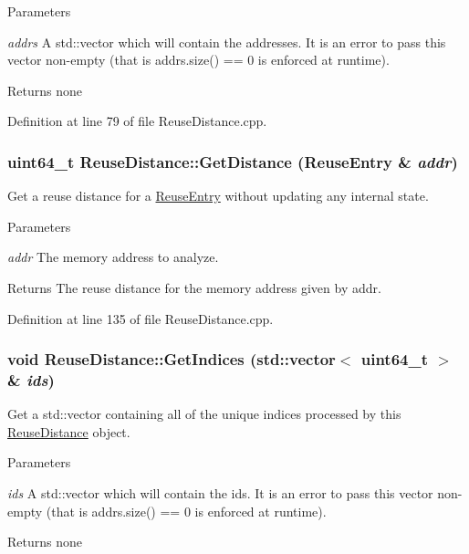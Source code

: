 \begin{DoxyParams}{Parameters}
\item[{\em addrs}]A std::vector which will contain the addresses. It is an error to pass this vector non-\/empty (that is addrs.size() == 0 is enforced at runtime).\end{DoxyParams}
\begin{DoxyReturn}{Returns}
none 
\end{DoxyReturn}


Definition at line 79 of file ReuseDistance.cpp.\hypertarget{class_reuse_distance_ac70a23e9dc4b242f11d76e257e894bef}{
\subsubsection[{GetDistance}]{\setlength{\rightskip}{0pt plus 5cm}uint64\_\-t ReuseDistance::GetDistance ({\bf ReuseEntry} \& {\em addr})}}
\label{class_reuse_distance_ac70a23e9dc4b242f11d76e257e894bef}
Get a reuse distance for a \hyperlink{struct_reuse_entry}{ReuseEntry} without updating any internal state.


\begin{DoxyParams}{Parameters}
\item[{\em addr}]The memory address to analyze.\end{DoxyParams}
\begin{DoxyReturn}{Returns}
The reuse distance for the memory address given by addr. 
\end{DoxyReturn}


Definition at line 135 of file ReuseDistance.cpp.\hypertarget{class_reuse_distance_a99fb4b3aae663676515ad354691b7cc6}{
\subsubsection[{GetIndices}]{\setlength{\rightskip}{0pt plus 5cm}void ReuseDistance::GetIndices (std::vector$<$ uint64\_\-t $>$ \& {\em ids})}}
\label{class_reuse_distance_a99fb4b3aae663676515ad354691b7cc6}
Get a std::vector containing all of the unique indices processed by this \hyperlink{class_reuse_distance}{ReuseDistance} object.


\begin{DoxyParams}{Parameters}
\item[{\em ids}]A std::vector which will contain the ids. It is an error to pass this vector non-\/empty (that is addrs.size() == 0 is enforced at runtime).\end{DoxyParams}
\begin{DoxyReturn}{Returns}
none 
\end{DoxyReturn}


